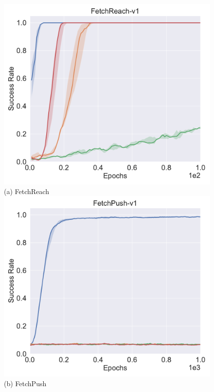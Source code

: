 \begin{figure}[t!]
\centering
{}
  \centering
  \includegraphics[width=\linewidth]{figures/chapter3/reach_baseline.pdf}
  ({a}) FetchReach
\endminipage
{}%
  \centering
  \includegraphics[width=\linewidth]{figures/chapter3/push_baseline.pdf}
  ({b}) FetchPush
\endminipage\hfill
{}%
  \centering

\end{figure}

